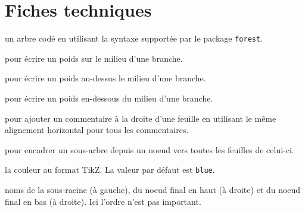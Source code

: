\documentclass[12pt,a4paper]{article}
\begin{document}

\section{Fiches techniques}



\Content{} un arbre codé en utilisant la syntaxe supportée par le package \verb+forest+.

\extraspace

  pour écrire un poids sur le milieu d'une branche.

 pour écrire un poids au-dessus le milieu d'une branche.

 pour écrire un poids en-dessous du milieu d'une branche.

\extraspace

 pour ajouter un commentaire à la droite d'une feuille en utilisant le même alignement horizontal pour tous les commentaires.

\extraspace

 pour encadrer un sous-arbre depuis un noeud vers toutes les feuilles de celui-ci.


\separation


 \hfill {}

\IDoption{} la couleur au format TikZ. La valeur par défaut est \verb#blue#.

 noms de la sous-racine (à gauche), du noeud final en haut (à droite) et du noeud final en bas (à droite). Ici l'ordre n'est pas important.
\end{document}
